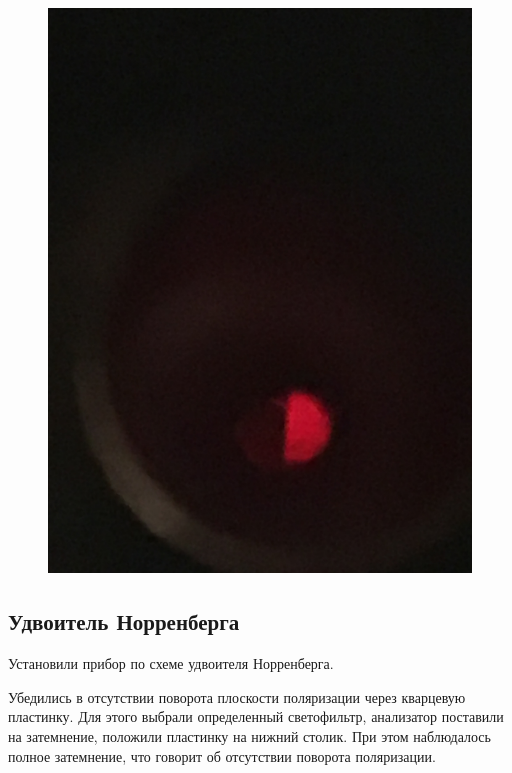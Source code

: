 \begin{figure}[h!]
\begin{minipage}{0.3\linewidth}
		\includegraphics[width=\linewidth]{biquarz/red-r.jpg}
	\end{minipage}
\end{figure}

\subsection{Удвоитель Норренберга}
Установили прибор по схеме удвоителя Норренберга.


Убедились в отсутствии поворота плоскости поляризации через кварцевую пластинку. Для этого выбрали определенный светофильтр, анализатор поставили на затемнение, положили пластинку на нижний столик. При этом наблюдалось полное затемнение, что говорит об отсутствии поворота поляризации.

